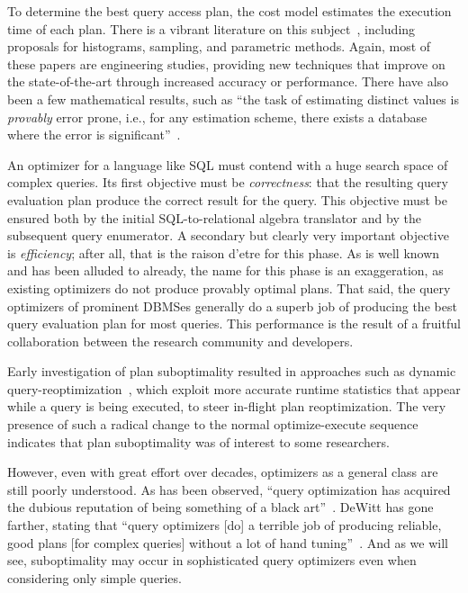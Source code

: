 \documentclass[prodmode,acmtods]{acmsmall}
\begin{document}
To determine the best query access plan, the cost model estimates the
execution time of each plan. There is a vibrant literature on this
subject~\hbox{\cite{Ioannidis03,Mannino88}}, including proposals for
histograms, sampling, and parametric methods. Again, most of these papers
are engineering studies, providing new techniques that improve on the
state-of-the-art through increased accuracy or performance. There have also
been a few mathematical results, such as ``the task of estimating distinct
values is {\em provably} error prone, i.e., for any estimation scheme, there
exists a database where the error is significant''~\cite{Chaudhuri98}.

An optimizer for a language like SQL must contend with a huge search space of
complex queries. Its first objective must be {\em correctness}: that the
resulting query evaluation plan produce the correct result for the
query. This objective must be ensured both by the initial SQL-to-relational
algebra translator and by the subsequent query enumerator. A secondary but clearly very important objective is {\em efficiency}; after
all, that is the raison d'etre for this phase. As is well known and has been
alluded to already, the name
for this phase is an exaggeration, as existing optimizers do not produce
provably optimal plans. That said, the
query optimizers of prominent \hbox{DBMSes} generally do a superb job of producing
the best query evaluation plan for most queries. This performance is the
result of a fruitful collaboration between the research community and
developers.

Early investigation of plan suboptimality resulted in approaches such as
dynamic query-reoptimization~\cite{Avnur,kabra98}, which exploit more
accurate runtime statistics that appear while a query is being executed, to
steer in-flight plan reoptimization. The very presence of such a radical
change to the normal optimize-execute sequence indicates that plan
suboptimality was of interest to some researchers.

However, even with great effort over decades, optimizers as a general class
are still poorly understood. As has been observed, ``query optimization has
acquired the dubious reputation of being something of a black
art''~\cite{Babcock05}. DeWitt has gone farther, stating that ``query
optimizers [do] a terrible job of producing reliable, good plans [for
  complex queries] without a lot of hand
tuning''~\cite[page~59]{winslett02}. And as we will see, suboptimality may
occur in sophisticated query optimizers even when considering only simple queries.
\end{document}
